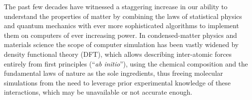 The past few decades have witnessed a staggering increase in our ability to understand the properties of matter by combining the laws of statistical physics and quantum mechanics with ever more sophisticated algorithms to implement them on computers of ever increasing power. In condensed-matter physics and materials science the scope of computer simulation has been vastly widened by density functional theory (DFT),\cite{Hohenberg1964,Kohn1965,MRS-DFT,Jain2016,Gillan2006} which allows describing inter-atomic forces entirely from first principles (``\emph{ab initio}''), using the chemical composition and the fundamental laws of nature as the sole ingredients, thus freeing molecular simulations from the need to leverage prior experimental knowledge of these interactions, which may be unavailable or not accurate enough.


